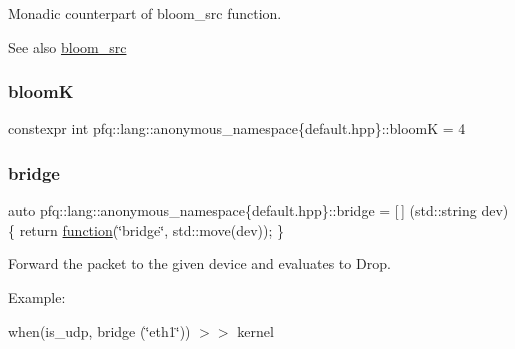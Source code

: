 Monadic counterpart of {\ttfamily bloom\+\_\+src} function. 

\begin{DoxySeeAlso}{See also}
\hyperlink{namespacepfq_1_1lang_1_1anonymous__namespace_02default_8hpp_03_aa2a8ff506d61e93d8eca4419513970f4}{bloom\+\_\+src} 
\end{DoxySeeAlso}
\mbox{\label{namespacepfq_1_1lang_1_1anonymous__namespace_02default_8hpp_03_a56750cdea1537acfa24c256b64924004}} 
\subsubsection{\texorpdfstring{bloomK}{bloomK}}
{\footnotesize\ttfamily constexpr int pfq\+::lang\+::anonymous\+\_\+namespace\{default.\+hpp\}\+::bloomK = 4}

\mbox{\label{namespacepfq_1_1lang_1_1anonymous__namespace_02default_8hpp_03_ad318dd8fb6441b78bdfb056173e5a7e2}} 
\subsubsection{\texorpdfstring{bridge}{bridge}}
{\footnotesize\ttfamily auto pfq\+::lang\+::anonymous\+\_\+namespace\{default.\+hpp\}\+::bridge = \mbox{[}$\,$\mbox{]} (std\+::string dev) \{ return \hyperlink{namespacepfq_1_1lang_a1a4638059d700ae08d0ca63886ff2bb3}{function}(\char`\"{}bridge\char`\"{}, std\+::move(dev)); \}}



Forward the packet to the given device and evaluates to {\ttfamily Drop}. 

Example\+:

when(is\+\_\+udp, bridge (\char`\"{}eth1\char`\"{})) $>$$>$ kernel


